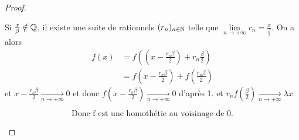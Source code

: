 \begin{proof}
\begin{enumerate}
		Si $\frac{x}{\beta}\notin\mathbb{Q}$, il existe une suite de rationnels $(r_{n})_{n\in\mathbb{N}}$ telle que $\lim\limits_{n\to+\infty}r_{n}=\frac{x}{\frac{\beta}{2}}$. On a alors 
		\begin{align*}
			f\left(x\right)
			&=f\left(\left(x-\frac{r_{n}\beta}{2}\right)+r_{n}\frac{\beta}{2}\right)\\
			&=f\left(x-\frac{r_{n}\beta}{2}\right)+f\left(\frac{r_{n}\beta}{2}\right)
		\end{align*}
		et $x-\frac{r_{n}\beta}{2}\xrightarrow[n\to+\infty]{}0$ et donc $f\left(x-\frac{r_{n}\beta}{2}\right)\xrightarrow[n\to+\infty]{}0$ d'après 1. et $r_{n}f\left(\frac{\beta}{2}\right)\xrightarrow[n\to+\infty]{}\lambda x$
		
		$$\boxed{\text{Donc f est une homothétie au voisinage de 0.}}$$
	\end{enumerate}
\end{proof}